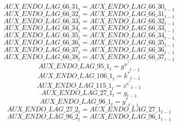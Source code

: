 \begin{dmath}
{AUX\_ENDO\_LAG\_66\_31}_{t}={AUX\_ENDO\_LAG\_66\_30}_{t-1}
\end{dmath}
\begin{dmath}
{AUX\_ENDO\_LAG\_66\_32}_{t}={AUX\_ENDO\_LAG\_66\_31}_{t-1}
\end{dmath}
\begin{dmath}
{AUX\_ENDO\_LAG\_66\_33}_{t}={AUX\_ENDO\_LAG\_66\_32}_{t-1}
\end{dmath}
\begin{dmath}
{AUX\_ENDO\_LAG\_66\_34}_{t}={AUX\_ENDO\_LAG\_66\_33}_{t-1}
\end{dmath}
\begin{dmath}
{AUX\_ENDO\_LAG\_66\_35}_{t}={AUX\_ENDO\_LAG\_66\_34}_{t-1}
\end{dmath}
\begin{dmath}
{AUX\_ENDO\_LAG\_66\_36}_{t}={AUX\_ENDO\_LAG\_66\_35}_{t-1}
\end{dmath}
\begin{dmath}
{AUX\_ENDO\_LAG\_66\_37}_{t}={AUX\_ENDO\_LAG\_66\_36}_{t-1}
\end{dmath}
\begin{dmath}
{AUX\_ENDO\_LAG\_66\_38}_{t}={AUX\_ENDO\_LAG\_66\_37}_{t-1}
\end{dmath}
\begin{dmath}
{AUX\_ENDO\_LAG\_95\_1}_{t}={{g^w^*}}_{t-1}
\end{dmath}
\begin{dmath}
{AUX\_ENDO\_LAG\_106\_1}_{t}={{k^*}}_{t-1}
\end{dmath}
\begin{dmath}
{AUX\_ENDO\_LAG\_115\_1}_{t}={{z^a^*}}_{t-1}
\end{dmath}
\begin{dmath}
{AUX\_ENDO\_LAG\_27\_1}_{t}={{g}}_{t-1}
\end{dmath}
\begin{dmath}
{AUX\_ENDO\_LAG\_96\_1}_{t}={{g^*}}_{t-1}
\end{dmath}
\begin{dmath}
{AUX\_ENDO\_LAG\_27\_2}_{t}={AUX\_ENDO\_LAG\_27\_1}_{t-1}
\end{dmath}
\begin{dmath}
{AUX\_ENDO\_LAG\_96\_2}_{t}={AUX\_ENDO\_LAG\_96\_1}_{t-1}
\end{dmath}
